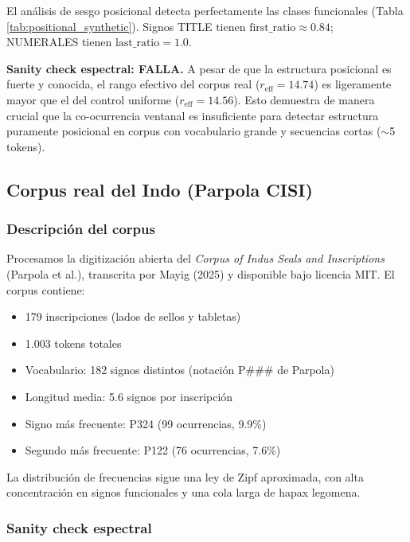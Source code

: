 \documentclass[11pt,a4paper]{article}
\newcommand{\1}{\mathbf{1}}
\numberwithin{equation}{section}
\begin{document}
El análisis de sesgo posicional detecta perfectamente las clases funcionales (Tabla \ref{tab:positional_synthetic}). Signos TITLE tienen $\text{first\_ratio} \approx 0.84$; NUMERALES tienen $\text{last\_ratio} = 1.0$.

\textbf{Sanity check espectral: FALLA.} A pesar de que la estructura posicional es fuerte y conocida, el rango efectivo del corpus real ($r_{\text{eff}} = 14.74$) es ligeramente mayor que el del control uniforme ($r_{\text{eff}} = 14.56$). Esto demuestra de manera crucial que la co-ocurrencia ventanal es insuficiente para detectar estructura puramente posicional en corpus con vocabulario grande y secuencias cortas ($\sim$5 tokens).

\subsection{Corpus real del Indo (Parpola CISI)}

\subsubsection{Descripción del corpus}

Procesamos la digitización abierta del \textit{Corpus of Indus Seals and Inscriptions} (Parpola et al.), transcrita por Mayig (2025) y disponible bajo licencia MIT. El corpus contiene:
\begin{itemize}
    \item 179 inscripciones (lados de sellos y tabletas)
    \item 1.003 tokens totales
    \item Vocabulario: 182 signos distintos (notación P\#\#\# de Parpola)
    \item Longitud media: 5.6 signos por inscripción
    \item Signo más frecuente: P324 (99 ocurrencias, 9.9\%)
    \item Segundo más frecuente: P122 (76 ocurrencias, 7.6\%)
\end{itemize}

La distribución de frecuencias sigue una ley de Zipf aproximada, con alta concentración en signos funcionales y una cola larga de hapax legomena.

\subsubsection{Sanity check espectral}
\end{document}
